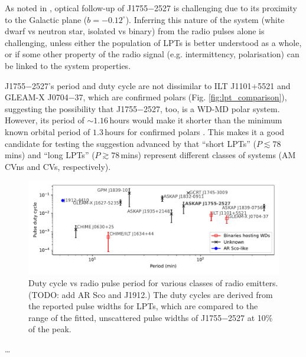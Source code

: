 \documentclass[preprint2,linenumbers]{aastex631}
\newcommand{\src}{J1755$-$2527}
\begin{document}
As noted in , optical follow-up of \src{} is challenging due to its proximity to the Galactic plane ($b = -0.12^\circ$).
Inferring this nature of the system (white dwarf vs neutron star, isolated vs binary) from the radio pulses alone is challenging, unless either the population of LPTs is better understood as a whole, or if some other property of the radio signal (e.g. intermittency, polarisation) can be linked to the system properties.

\src{}'s period and duty cycle are not dissimilar to ILT J1101+5521 and GLEAM-X J0704$-$37, which are confirmed polars (Fig. \ref{fig:lpt_comparison}), suggesting the possibility that \src{}, too, is a WD-MD polar system.
However, its period of ${\sim}1.16\,$hours would make it shorter than the minimum known orbital period of $1.3\,$hours for confirmed polars \citep{schwope2025polarcatcatalogpolarslowaccretion}.
This makes it a good candidate for testing the suggestion advanced by \citet{2025arXiv250103315R} that ``short LPTs'' ($P \lesssim 78\,$mins) and ``long LPTs'' ($P \gtrsim 78\,$mins) represent different classes of systems (AM CVns and CVs, respectively).
\begin{figure}[th]
    \centering
    \includegraphics[width=0.98\linewidth]{lpt_comparison.pdf}
    \caption{Duty cycle vs radio pulse period for various classes of radio emitters. (TODO: add AR Sco and J1912.) The duty cycles are derived from the reported pulse widths for LPTs, which are compared to the range of the fitted, unscattered pulse widths of \src{} at 10\% of the peak.}
    \label{fig:enter-label}
\end{figure}


\dots

\end{document}
